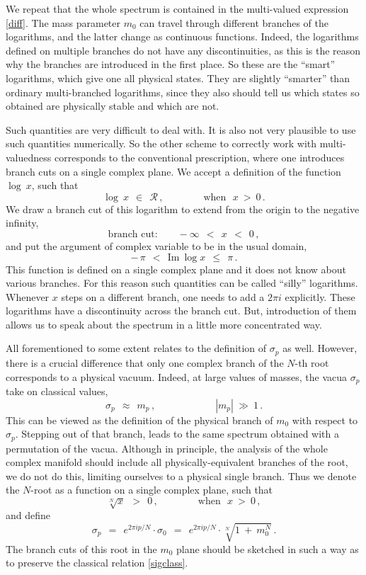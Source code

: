 \documentclass[epsfig,12pt]{article}
\def\beq{\begin{equation}}
\def\eeq{\end{equation}}
\def\beq{\begin{equation}}
\def\eeq{\end{equation}}
\newcommand{\mc}[1]{\mathcal{#1}}
\begin{document}
	We repeat that the whole spectrum is contained in the multi-valued expression \eqref{diff}.
	The mass parameter $ m_0 $ can travel through different branches of the logarithms, and
	the latter change as continuous functions.
	Indeed, the logarithms defined on multiple branches do not have any discontinuities,
	as this is the reason why the branches are introduced in the first place. 
	So these are the ``smart'' logarithms, which give one all physical states. 
	They are slightly ``smarter'' than ordinary multi-branched logarithms, since they also should tell us
	which states so obtained are physically stable and which are not. 

	Such quantities are very difficult to deal with. 
	It is also not very plausible to use such quantities numerically.
	So the other scheme to correctly work with multi-valuedness corresponds to the conventional prescription, 
	where one introduces branch cuts on a single complex plane. 
	We accept a definition of the function $ \log~x $, such that
\beq
	\log~x ~~\in~~ \mc{R}\,, \qquad\qquad \text{when~~} x ~>~ 0\,.
\eeq
	We draw a branch cut of this logarithm to extend from the origin to the negative infinity,
\beq
	\text{branch cut:}\qquad -\infty ~~<~~ x ~~<~~ 0\,,
\eeq
	and put the argument of complex variable to be in the usual domain,
\beq
	-\,\pi ~~<~~  \text{Im}~\log x  ~~\leq~~ \pi\,.
\eeq
	This function is defined on a single complex plane and it does not know about various branches.
	For this reason such quantities can be called ``silly'' logarithms.
	Whenever $ x $ steps on a different branch, one needs to add a $ 2 \pi i $ explicitly.
	These logarithms have a discontinuity across the branch cut.
	But, introduction of them allows us to speak about the spectrum in a little more concentrated way. 

	All forementioned to some extent relates to the definition of $ \sigma_p $ as well.
	However, there is a crucial difference that only one complex branch of the $ N $-th root corresponds
	to a physical vacuum.
	Indeed, at large values of masses, the vacua $ \sigma_p $ take on classical values,
\beq
\label{sigclass}
	\sigma_p  ~~\approx~~ m_p\,,  \qquad\qquad\qquad |m_p| ~\gg~ 1\,.
\eeq
	This can be viewed as the definition of the physical branch of $ m_0 $ with respect to $ \sigma_p $.
	Stepping out of that branch, leads to the same spectrum obtained with a permutation of the vacua.
	Although in principle, the analysis of the whole complex manifold should include 
	all physically-equivalent branches of the root, we do not do this, 
	limiting ourselves to a physical single branch.
	Thus we denote the $ N $-root as a function on a single complex plane, such that
\beq
	\sqrt[N]{x} ~~>~~ 0\,, \qquad\qquad \text{when~~} x ~>~ 0\,,
\eeq
	and define
\beq
	\sigma_p ~~=~~ e^{2 \pi i p / N} \cdot \sigma_0 ~~=~~ e^{2 \pi i p / N} \cdot \sqrt[N]{ 1 ~+~ m_0^N }\,.
\eeq
	The branch cuts of this root in the $ m_0 $ plane should be sketched in such a way as to preserve
	the classical relation \eqref{sigclass}.
	
\end{document}
